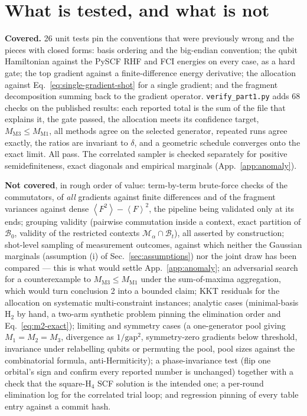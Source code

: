 \documentclass[10pt]{article}
\newcommand{\expect}[1]{\left\langle #1 \right\rangle}
\begin{document}
\section{What is tested, and what is not}
\label{sec:tests}

\textbf{Covered.} 26 unit tests pin the conventions that were previously wrong
and the pieces with closed forms: basis ordering and the big-endian convention;
the qubit Hamiltonian against the PySCF RHF and FCI energies on every case, as a
hard gate; the top gradient against a finite-difference energy derivative; the
allocation against Eq.~\eqref{eq:single-gradient-shot} for a single gradient; and
the fragment decomposition summing back to the gradient operator.
\texttt{verify\_part1.py} adds 68 checks on the published results: each reported
total is the sum of the file that explains it, the gate passed, the allocation
meets its confidence target, $M_{\mathrm{M3}}\le M_{\mathrm{M1}}$, all methods
agree on the selected generator, repeated runs agree exactly, the ratios are
invariant to $\delta$, and a geometric schedule converges onto the exact limit.
All pass. The correlated sampler is checked separately for positive
semidefiniteness, exact diagonals and empirical marginals
(App.~\ref{app:anomaly}).

\textbf{Not covered}, in rough order of value: term-by-term brute-force checks of
the commutators, of \emph{all} gradients against finite differences and of the
fragment variances against dense $\expect{F^2}-\expect{F}^2$, the pipeline being
validated only at its ends; grouping validity (pairwise commutation inside a
context, exact partition of $\mathcal B_0$, validity of the restricted contexts
$\mathcal M_\alpha\cap\mathcal B_t$), all asserted by construction; shot-level
sampling of measurement outcomes, against which neither the Gaussian marginals
(assumption (i) of Sec.~\ref{sec:assumptions}) nor the joint draw has been
compared --- this is what would settle App.~\ref{app:anomaly}; an adversarial
search for a counterexample to $M_{\mathrm{M3}}\le M_{\mathrm{M1}}$ under the
sum-of-maxima aggregation, which would turn conclusion 2 into a bounded claim;
KKT residuals for the allocation on systematic multi-constraint instances;
analytic cases (minimal-basis H$_2$ by hand, a two-arm synthetic problem pinning
the elimination order and Eq.~\eqref{eq:m2-exact}); limiting and symmetry cases (a
one-generator pool giving $M_1=M_2=M_3$, divergence as $1/\mathrm{gap}^2$,
symmetry-zero gradients below threshold, invariance under relabelling qubits or
permuting the pool, pool sizes against the combinatorial formula,
anti-Hermiticity); a phase-invariance test (flip one orbital's sign and confirm
every reported number is unchanged) together with a check that the square-H$_4$
SCF solution is the intended one; a per-round elimination log for the correlated
trial loop; and regression pinning of every table entry against a commit hash.
\end{document}
